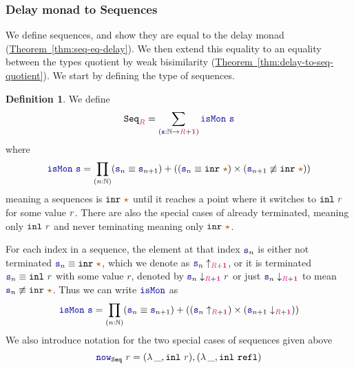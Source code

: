 \documentclass[twoside,11pt,openright]{report}
\theoremstyle{plain} %
\theoremstyle{definition}
\newtheorem{defn}[thm]{Definition}%
\theoremstyle{remark}
\newcommand*{\thmref}[1]{\hyperref[thm:#1]{Theorem~\ref*{thm:#1}}} %
\newcommand*{\term}[1]{\textcolor{green!30!black}{#1}} %
\newcommand*{\type}[1]{\textcolor{magenta!90!black}{#1}}
\newcommand*{\unit}{\type{\textbf{1}}}
\newcommand*{\constant}[1]{\textcolor{orange!60!black}{\ensuremath{\mathtt{#1}}}}
\newcommand*{\function}[1]{\textcolor{blue!60!black}{\ensuremath{\mathtt{#1}}}}
\newcommand*{\typeformer}[1]{\ensuremath{\mathtt{#1}}}
\newcommand*{\unitelem}{\constant{\star}} %
\begin{document}
\subsubsection{Delay monad to Sequences}
We define sequences, and show they are equal to the delay monad (\thmref{seq-eq-delay}). We then extend this equality to an equality between the types quotient by weak bisimilarity (\thmref{delay-to-seq-quotient}). We start by defining the type of sequences.
\label{sec:delay-monad-to-sequences}
\begin{defn}
  We define
  \begin{equation}
    \typeformer{Seq}_{\type{R}} = \sum_{(\function{s} : \mathbb{N} \rightarrow \type{R} + \unit)} \function{isMon}~\function{s}
  \end{equation}
  where
  \begin{equation}
    \function{isMon}~\function{s} = \prod_{(n : \mathbb{N})} (\function{s}_n \equiv \function{s}_{n+1})  + ((\function{s}_n \equiv \mathtt{inr}~\unitelem) \times (\function{s}_{n+1} \not\equiv \mathtt{inr}~\unitelem))
  \end{equation}
  meaning a sequences is \(\mathtt{inr}~\unitelem\) until it reaches a point where it switches to \(\mathtt{inl}~\term{r}\) for some value \(\term{r}\). There are also the special cases of already terminated, meaning only \(\mathtt{inl}~\term{r}\) and never teminating meaning only \(\mathtt{inr}~\unitelem\).
\end{defn}
\noindent For each index in a sequence, the element at that index \(\function{s}_n\) is either not terminated \(\function{s}_n \equiv \mathtt{inr}~\unitelem\), which we denote as \(\function{s}_n \uparrow_{\type{R} + \unit}\), or it is terminated \(\function{s}_n \equiv \mathtt{inl}~\term{r}\) with some value \(r\), denoted by \(\function{s}_n \downarrow_{\type{R} + \unit} \term{r}\) or just \(\function{s}_n \downarrow_{\type{R} + \unit}\) to mean \(\function{s}_n \not\equiv \mathtt{inr}~\unitelem\). Thus we can write \(\function{isMon}\) as
\begin{equation}
  \function{isMon}~\function{s} = \prod_{(n : \mathbb{N})} (\function{s}_n \equiv \function{s}_{n+1})  + ((\function{s}_n \uparrow_{\type{R} + \unit}) \times (\function{s}_{n+1} \downarrow_{\type{R} + \unit}))
\end{equation}
We also introduce notation for the two special cases of sequences given above
\begin{equation}
  \function{now}_{\typeformer{Seq}}~\term{r} = (\lambda\,\_, \mathtt{inl}~\term{r}) , (\lambda\,\_, \mathtt{inl}~\mathtt{refl})
\end{equation}
\end{document}
